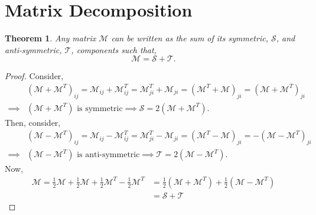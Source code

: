 \documentclass{book}
\newtheorem*{theorem}{Theorem}
\begin{document}
\section{Matrix Decomposition}
\begin{theorem}
    Any matrix $\mathcal{M}$ can be written as the sum of its symmetric, $\mathcal{S}$, and anti-symmetric, $\mathcal{T}$, components such that,
    \begin{equation}
        \mathcal{M} = \mathcal{S} + \mathcal{T}.
    \end{equation}
\end{theorem}
\begin{proof}
    Consider,
    \begin{equation}
        \begin{split}
            &(\mathcal{M} + \mathcal{M}^T)_{ij} = \mathcal{M}_{ij} + \mathcal{M}_{ij}^T = \mathcal{M}_{ji}^T + \mathcal{M}_{ji} = (\mathcal{M}^T + \mathcal{M})_{ji} = (\mathcal{M} + \mathcal{M}^T)_{ji} \\
            \implies&(\mathcal{M} + \mathcal{M}^T)\text{ is symmetric}\implies \mathcal{S} = 2(\mathcal{M} + \mathcal{M}^T).
        \end{split}
    \end{equation}
    Then, consider,
    \begin{equation}
    \begin{split}
            &(\mathcal{M} - \mathcal{M}^T)_{ij} = \mathcal{M}_{ij} - \mathcal{M}_{ij}^T = \mathcal{M}_{ji}^T - \mathcal{M}_{ji} = (\mathcal{M}^T - \mathcal{M})_{ji} = -(\mathcal{M} - \mathcal{M}^T)_{ji} \\
            \implies&(\mathcal{M} - \mathcal{M}^T)\text{ is anti-symmetric}\implies \mathcal{T} = 2(\mathcal{M} - \mathcal{M}^T).
        \end{split}
    \end{equation}
    Now,
    \begin{equation}
        \begin{split}
            \mathcal{M} = \frac{1}{2}\mathcal{M} + \frac{1}{2}\mathcal{M} + \frac{1}{2}\mathcal{M}^T - \frac{1}{2}\mathcal{M}^T & = \frac{1}{2}(\mathcal{M} + \mathcal{M}^T) + \frac{1}{2}(\mathcal{M} -\mathcal{M}^T) \\
            & = \mathcal{S} + \mathcal{T}
        \end{split}
    \end{equation}
\end{proof}
\newpage
\end{document}
